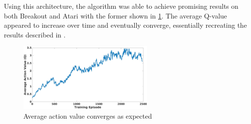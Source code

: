 Using this architecture, the algorithm was able to achieve promising results on both Breakout and Atari with the former shown in \ref{fig:breakout}. The average Q-value appeared to increase over time and eventually converge, essentially recreating the results described in \cite{mnih2013playing}.

\begin{figure}[h!]
\centering\includegraphics[width=0.6\textwidth]{Graphics/breakout_AveQ.jpg}
\caption[Average Action Value Plot for Breakout]{Average action value converges as expected}
\label{fig:breakout}
\end{figure}

\endinput



